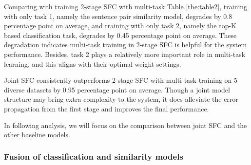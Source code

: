 Comparing with training 2-stage SFC with multi-task Table \ref{tbe:table2}, training with only task 1, namely the sentence pair similarity model, degrades by 0.8 percentage point on average, and training with only task 2, namely the top-K based classification task, degrades by 0.45 percentage point on average. 
These degradation indicates multi-task training in 2-stage SFC is helpful for the system performance. Besides, task 2 plays a relatively more important role in multi-task learning, and this aligns with their optimal weight settings.

Joint SFC consistently outperforms 2-stage SFC with multi-task training on 5 diverse datasets by 0.95 percentage point on average. 
Though a joint model structure may bring extra complexity to the system, it does alleviate the error propagation from the first stage and improves the final performance.

In following analysis, we will focus on the comparison between joint SFC and the other baseline models.

\subsubsection*{Fusion of classification and similarity models} 

\begin{table}
  \begin{centering}
  \end{centering}
  \caption{
    The performances of SFC from different settings of hyperparameters, $K$ denoting the candidate class number from stage 1,
    $P$ denoting the number of sampled sentence pair in stage 2. 
  }
  \label{tbe:table3}
\end{table}

